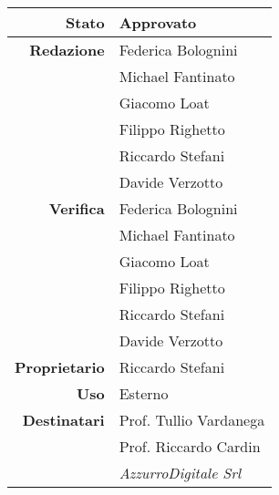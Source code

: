 \thispagestyle{empty} %

\begin{center}
\begin{tabular}{r|l}
    \textbf{Stato} & Approvato \\
    \hline
    \textbf{Redazione} & Federica Bolognini \\
                       & Michael Fantinato \\
                       & Giacomo Loat \\
                       & Filippo Righetto \\
                       & Riccardo Stefani \\
                       & Davide Verzotto \\
    \hline
    \textbf{Verifica} & Federica Bolognini \\
                      & Michael Fantinato \\
                      & Giacomo Loat \\
                      & Filippo Righetto \\
                      & Riccardo Stefani \\
                      & Davide Verzotto \\
    \hline
    \textbf{Proprietario} & Riccardo Stefani \\
    \hline
    \textbf{Uso} & Esterno \\
    \hline
    \textbf{Destinatari} & Prof. Tullio Vardanega \\
                         & Prof. Riccardo Cardin \\
                         & \emph{AzzurroDigitale Srl} \\
\end{tabular}
\end{center}
    
